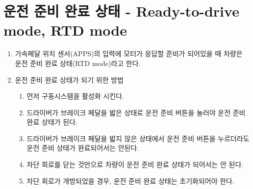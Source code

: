\documentclass[final,a4paper,10pt]{report}
\begin{document}
\section{운전 준비 완료 상태 - Ready-to-drive mode, RTD mode}\label{rule:formula-technical.ready-to-drive-mode}
\begin{enumerate}
  \item\label{rule:formula-technical.ready-to-drive-mode.definition} 가속페달 위치 센서(APPS)의 입력에 모터가 응답할 준비가 되어있을 때 차량은 운전 준비 완료 상태(RTD mode)라고 한다.

  \item\label{rule:formula-technical.ready-to-drive-mode.entry-procedure} 운전 준비 완료 상태가 되기 위한 방법
    \begin{enumerate}
      \item\label{rule:formula-technical.ready-to-drive-mode.entry-procedure.activate-tractive-system} 먼저 구동시스템을 활성화 시킨다.
      \item\label{rule:formula-technical.ready-to-drive-mode.entry-procedure.rtd-button-while-braking} 드라이버가 브레이크 페달을 밟은 상태로 운전 준비 버튼을 눌러야 운전 준비 완료 상태가 된다.
      \item\label{rule:formula-technical.ready-to-drive-mode.entry-procedure.no-rtd-without-brake} 드라이버가 브레이크 페달을 밟지 않은 상태에서 운전 준비 버튼을 누르더라도 운전 준비 상태가 완료되어서는 안된다.
      \item\label{rule:formula-technical.ready-to-drive-mode.entry-procedure.sdc-close-not-sufficient} 차단 회로를 닫는 것만으로 차량이 운전 준비 완료 상태가 되어서는 안 된다.
      \item\label{rule:formula-technical.ready-to-drive-mode.entry-procedure.reset-on-sdc-open} 차단 회로가 개방되었을 경우, 운전 준비 완료 상태는 초기화되어야 한다.
    \end{enumerate}


\end{enumerate}
\end{document}
